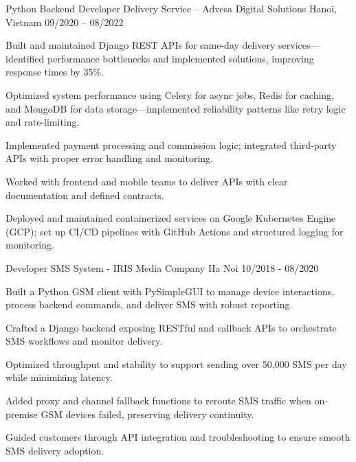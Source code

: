 \begin{cventries}
\cventry
  {Python Backend Developer} %
  {Delivery Service – Advesa Digital Solutions} %
  {Hanoi, Vietnam} %
  {09/2020 -- 08/2022} %
  {
    \begin{cvitems}
      \item {Built and maintained Django REST APIs for same-day delivery services—identified performance bottlenecks and implemented solutions, improving response times by 35\%.}
      \item {Optimized system performance using Celery for async jobs, Redis for caching, and MongoDB for data storage—implemented reliability patterns like retry logic and rate-limiting.}
      \item {Implemented payment processing and commission logic; integrated third-party APIs with proper error handling and monitoring.}
      \item {Worked with frontend and mobile teams to deliver APIs with clear documentation and defined contracts.}
      \item {Deployed and maintained containerized services on Google Kubernetes Engine (GCP); set up CI/CD pipelines with GitHub Actions and structured logging for monitoring.}
    \end{cvitems}
  }

\cventry
{Developer} %
{SMS System - IRIS Media Company} %
{Ha Noi} %
{10/2018 - 08/2020} %
{
    \begin{cvitems}
        \item {Built a Python GSM client with PySimpleGUI to manage device interactions, process backend commands, and deliver SMS with robust reporting.}
        \item {Crafted a Django backend exposing RESTful and callback APIs to orchestrate SMS workflows and monitor delivery.}
        \item {Optimized throughput and stability to support sending over 50,000 SMS per day while minimizing latency.}
        \item {Added proxy and channel fallback functions to reroute SMS traffic when on-premise GSM devices failed, preserving delivery continuity.}
        \item {Guided customers through API integration and troubleshooting to ensure smooth SMS delivery adoption.}
    \end{cvitems}
}


\end{cventries}
